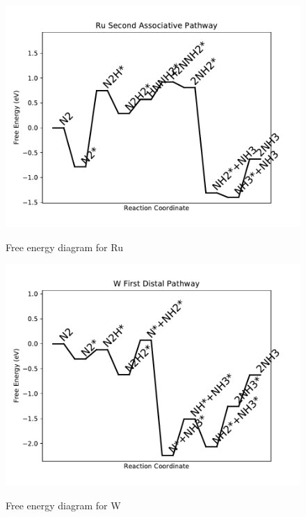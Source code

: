 \documentclass{article}
\begin{document}
\newpage
\begin{figure}
\includegraphics[width=1\linewidth]{data/plots/Ru_associative_2.pdf}
\label{fig:Ru_associative_2}
\caption{Free energy diagram for Ru}
\end{figure}

\begin{figure}
\includegraphics[width=1\linewidth]{data/plots/W_distal_1.pdf}
\label{fig:W_distal_1}
\caption{Free energy diagram for W}
\end{figure}
\end{document}
